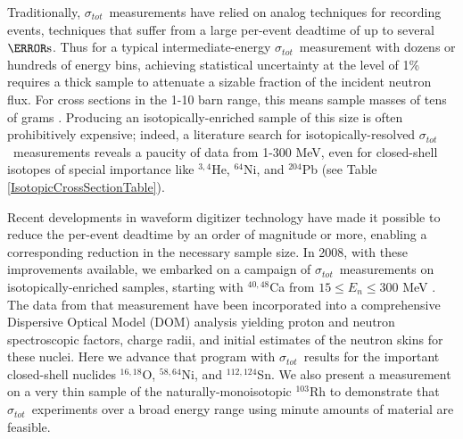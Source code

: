 \documentclass[twocolumn,secnumarabic,amssymb, nobibnotes, aps, prl,
superscriptaddress, nobalancelastpage]{revtex4}
\newcommand{\tot}{\ensuremath{\sigma_{tot}}}
\begin{document}
Traditionally, \tot\ measurements have relied on analog techniques for recording
events, techniques that suffer from a large per-event deadtime of
up to several $\micro\second$. Thus for a typical intermediate-energy \tot\ measurement
with dozens or hundreds of energy bins, achieving statistical uncertainty at the
level of 1\% requires a thick sample to attenuate a sizable fraction of the
incident neutron flux. For cross sections in the 1-10 barn range, this means
sample masses of tens of grams \cite{Finlay1993, Abfalterer2001}.
Producing an isotopically-enriched sample of this size is often
prohibitively expensive; indeed, a literature search for isotopically-resolved
\tot\ measurements reveals a paucity of data from 1-300 MeV, even for
closed-shell isotopes of special importance like $^{3,4}$He, $^{64}$Ni, and
$^{204}$Pb (see Table \ref{IsotopicCrossSectionTable}).


Recent developments in waveform digitizer technology have made it
possible to reduce the per-event deadtime by an order of magnitude or more,
enabling a corresponding reduction in the necessary sample size. In 2008, with
these improvements available, we
embarked on a campaign of \tot\ measurements on isotopically-enriched samples,
starting with $^{40,48}$Ca from $15 \leq E_{n} \leq 300$ MeV \cite{Shane2010}.
The data from that measurement have been incorporated into a comprehensive
Dispersive Optical Model (DOM) analysis \cite{Mueller2011, Mahzoon2014,
MahzoonPhDThesis} yielding proton and neutron spectroscopic factors, charge
radii, and initial estimates of the neutron skins \cite{Mahzoon2017}
for these nuclei.
Here we advance that program with \tot\ results for
the important closed-shell nuclides
$^{16,18}$O, $^{58,64}$Ni, and $^{112,124}$Sn. We also present a measurement
on a very thin sample of the naturally-monoisotopic $^{103}$Rh to demonstrate that
\tot\ experiments over a broad energy range using minute amounts of material are feasible.
\end{document}
